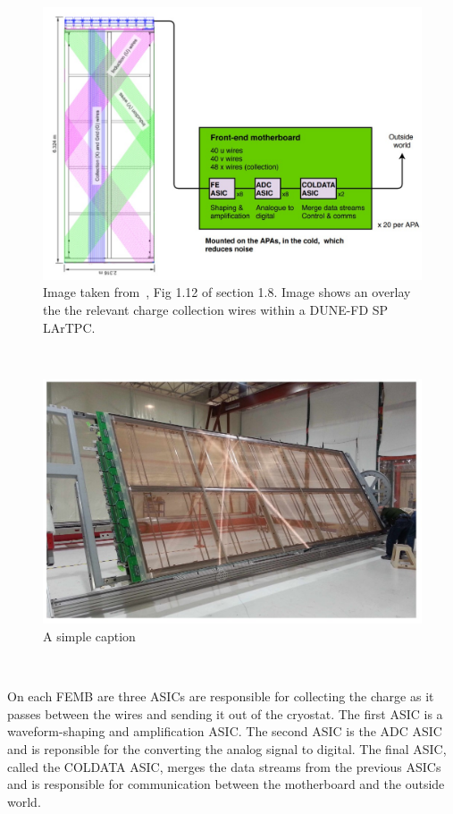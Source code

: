 \begin{figure}[]
\centering
\includegraphics[width=\textwidth]{images/dune_apa_motherboards.jpg}
\caption{Image taken from~\citep{DUNE-FD_TDRv4:Abi_2020}, Fig 1.12 of section 1.8.
Image shows an overlay the the relevant charge collection wires within a DUNE-FD SP LArTPC.
}
\end{figure}~\label{fig:dune_tpc_electronics}

\begin{figure}[]
\centering
\includegraphics[width=\textwidth]{images/dune_fd_tdr_apa_image.jpg}
\caption{A simple caption \citep{DUNE-FD_TDRv4:Abi_2020}}
\end{figure}~\label{fig:dune_apa_tdr}

On each FEMB are three ASICs are responsible for collecting the charge as it passes between the wires and sending it out of the cryostat.
The first ASIC is a waveform-shaping and amplification ASIC.
The second ASIC is the ADC ASIC and is reponsible for the converting the analog signal to digital.
The final ASIC, called the COLDATA ASIC, merges the data streams from the previous ASICs and is responsible for communication between the motherboard and the outside world.

